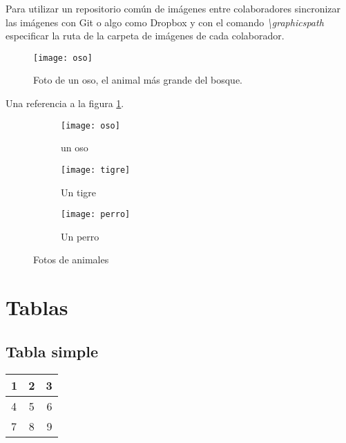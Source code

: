 \documentclass[12pt, a4paper,twoside]{article} %
\begin{document}
Para utilizar un repositorio común de imágenes entre colaboradores sincronizar las imágenes con Git o algo como Dropbox y con el comando \emph{\textbackslash graphicspath} especificar la ruta de la carpeta de imágenes de cada colaborador.

\begin{figure}[!ht]
	\centering
		\texttt{[image: oso]}
		\caption[Foto de un oso.]{Foto de un oso, el animal más grande del bosque.}
		\label{fig:oso}
\end{figure}

Una referencia a la figura \ref{fig:oso}.

\begin{figure}
	\centering
	\begin{subfigure}[b]{0.3\textwidth}
		\centering
		\texttt{[image: oso]}
		\caption{un oso}
		\label{subfig:oso}
	\end{subfigure}
	\quad
	\begin{subfigure}[b]{0.3\textwidth}
		\centering
		\texttt{[image: tigre]}
		\caption{Un tigre}
		\label{subfig:tigre}
	\end{subfigure}
	\begin{subfigure}[b]{0.3\textwidth}
		\centering
		\texttt{[image: perro]}
		\caption{Un perro}
		\label{subfig:perro}
	\end{subfigure}
	\caption{Fotos de animales}\label{fig:animals}
\end{figure}

\section{Tablas}
\subsection{Tabla simple}
\begin{tabular}{| l | c | r |}
	\hline
  1 & 2 & 3 \\ \hline
  4 & 5 & 6 \\ \hline
  7 & 8 & 9 \\ \hline
\end{tabular}
\end{document}
